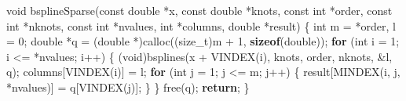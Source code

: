 \documentclass[
  12pt,
  letterpaper,
  DIV=11,
  numbers=noendperiod]{scrreprt}
\newenvironment{Shaded}{\begin{snugshade}}{\end{snugshade}}
\newcommand{\ControlFlowTok}[1]{\textcolor[rgb]{0.00,0.23,0.31}{\textbf{#1}}}
\newcommand{\DataTypeTok}[1]{\textcolor[rgb]{0.68,0.00,0.00}{#1}}
\newcommand{\DecValTok}[1]{\textcolor[rgb]{0.68,0.00,0.00}{#1}}
\newcommand{\KeywordTok}[1]{\textcolor[rgb]{0.00,0.23,0.31}{\textbf{#1}}}
\newcommand{\NormalTok}[1]{\textcolor[rgb]{0.00,0.23,0.31}{#1}}
\newcommand{\OperatorTok}[1]{\textcolor[rgb]{0.37,0.37,0.37}{#1}}
\theoremstyle{remark}
\begin{document}
\begin{Shaded}
\begin{Highlighting}[]
\DataTypeTok{void}\NormalTok{ bsplineSparse}\OperatorTok{(}\DataTypeTok{const} \DataTypeTok{double} \OperatorTok{*}\NormalTok{x}\OperatorTok{,} \DataTypeTok{const} \DataTypeTok{double} \OperatorTok{*}\NormalTok{knots}\OperatorTok{,} \DataTypeTok{const} \DataTypeTok{int} \OperatorTok{*}\NormalTok{order}\OperatorTok{,}
                   \DataTypeTok{const} \DataTypeTok{int} \OperatorTok{*}\NormalTok{nknots}\OperatorTok{,} \DataTypeTok{const} \DataTypeTok{int} \OperatorTok{*}\NormalTok{nvalues}\OperatorTok{,} \DataTypeTok{int} \OperatorTok{*}\NormalTok{columns}\OperatorTok{,}
                   \DataTypeTok{double} \OperatorTok{*}\NormalTok{result}\OperatorTok{)} \OperatorTok{\{}
    \DataTypeTok{int}\NormalTok{ m }\OperatorTok{=} \OperatorTok{*}\NormalTok{order}\OperatorTok{,}\NormalTok{ l }\OperatorTok{=} \DecValTok{0}\OperatorTok{;}
    \DataTypeTok{double} \OperatorTok{*}\NormalTok{q }\OperatorTok{=} \OperatorTok{(}\DataTypeTok{double} \OperatorTok{*)}\NormalTok{calloc}\OperatorTok{((}\DataTypeTok{size\_t}\OperatorTok{)}\NormalTok{m }\OperatorTok{+} \DecValTok{1}\OperatorTok{,} \KeywordTok{sizeof}\OperatorTok{(}\DataTypeTok{double}\OperatorTok{));}
    \ControlFlowTok{for} \OperatorTok{(}\DataTypeTok{int}\NormalTok{ i }\OperatorTok{=} \DecValTok{1}\OperatorTok{;}\NormalTok{ i }\OperatorTok{\textless{}=} \OperatorTok{*}\NormalTok{nvalues}\OperatorTok{;}\NormalTok{ i}\OperatorTok{++)} \OperatorTok{\{}
        \OperatorTok{(}\DataTypeTok{void}\OperatorTok{)}\NormalTok{bsplines}\OperatorTok{(}\NormalTok{x }\OperatorTok{+}\NormalTok{ VINDEX}\OperatorTok{(}\NormalTok{i}\OperatorTok{),}\NormalTok{ knots}\OperatorTok{,}\NormalTok{ order}\OperatorTok{,}\NormalTok{ nknots}\OperatorTok{,} \OperatorTok{\&}\NormalTok{l}\OperatorTok{,}\NormalTok{ q}\OperatorTok{);}
\NormalTok{        columns}\OperatorTok{[}\NormalTok{VINDEX}\OperatorTok{(}\NormalTok{i}\OperatorTok{)]} \OperatorTok{=}\NormalTok{ l}\OperatorTok{;}
        \ControlFlowTok{for} \OperatorTok{(}\DataTypeTok{int}\NormalTok{ j }\OperatorTok{=} \DecValTok{1}\OperatorTok{;}\NormalTok{ j }\OperatorTok{\textless{}=}\NormalTok{ m}\OperatorTok{;}\NormalTok{ j}\OperatorTok{++)} \OperatorTok{\{}
\NormalTok{            result}\OperatorTok{[}\NormalTok{MINDEX}\OperatorTok{(}\NormalTok{i}\OperatorTok{,}\NormalTok{ j}\OperatorTok{,} \OperatorTok{*}\NormalTok{nvalues}\OperatorTok{)]} \OperatorTok{=}\NormalTok{ q}\OperatorTok{[}\NormalTok{VINDEX}\OperatorTok{(}\NormalTok{j}\OperatorTok{)];}
        \OperatorTok{\}}
    \OperatorTok{\}}
\NormalTok{    free}\OperatorTok{(}\NormalTok{q}\OperatorTok{);}
    \ControlFlowTok{return}\OperatorTok{;}
\OperatorTok{\}}


\end{Highlighting}
\end{Shaded}
\end{document}
